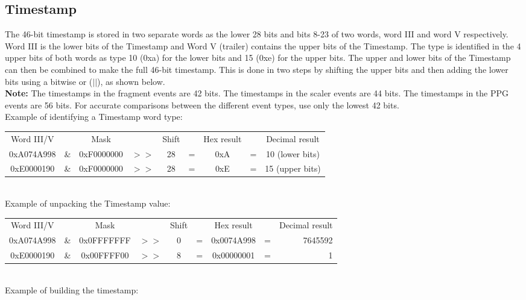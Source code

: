 \documentclass[letterpaper,12pt,notitlepage]{report}
\begin{document}
\subsection{Timestamp}
The 46-bit timestamp is stored in two separate words as the lower 28 bits and bits 8-23 of two words, word III and word V respectively. Word III is the lower bits of the Timestamp and Word V (trailer) contains the upper bits of the Timestamp. The type is identified in the 4 upper bits of both words as type 10 (0xa) for the lower bits and 15 (0xe) for the upper bits. The upper and lower bits of the Timestamp can then be combined to make the full 46-bit timestamp. This is done in two steps by shifting the upper bits and then adding the lower bits using a bitwise or ($||$), as shown below.\\

{\bf Note:} The timestamps in the fragment events are 42 bits. The timestamps in the scaler events are 44 bits. The timestamps in the PPG events are 56 bits. For accurate comparisons between the different event types, use only the lowest 42 bits.\\

Example of identifying a Timestamp word type:\\

\begin{tabular}{ccccccccc}
Word III/V &  & Mask & & Shift & & Hex result & & Decimal result\\
0xA074A998 & \& & 0xF0000000 & $>>$ & 28 & = & 0xA & = & 10 (lower bits)\\
0xE0000190 & \& & 0xF0000000 & $>>$ & 28 & = & 0xE & = & 15 (upper bits)\\
\end{tabular}\\

Example of unpacking the Timestamp value:\\

\begin{tabular}{ccccccccr}
Word III/V &  & Mask & & Shift & & Hex result & & Decimal result\\
0xA074A998 & \& & 0x0FFFFFFF & $>>$ & 0 & = & 0x0074A998 & = & 7645592\\
0xE0000190 & \& & 0x00FFFF00 & $>>$ & 8 & = & 0x00000001 & = & 1\\
\end{tabular}\\

Example of building the timestamp:\\
\end{document}
